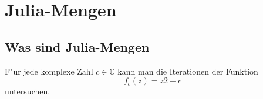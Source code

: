 \chapter{Julia-Mengen}
\begin{refsection}

\section{Was sind Julia-Mengen}
F"ur jede komplexe Zahl $c\in\mathbb C$ kann man die Iterationen der
Funktion
\[
f_c(z)=z 2 + c
\]
untersuchen.

\printbibliography[heading=subbibliography]
\end{refsection}
